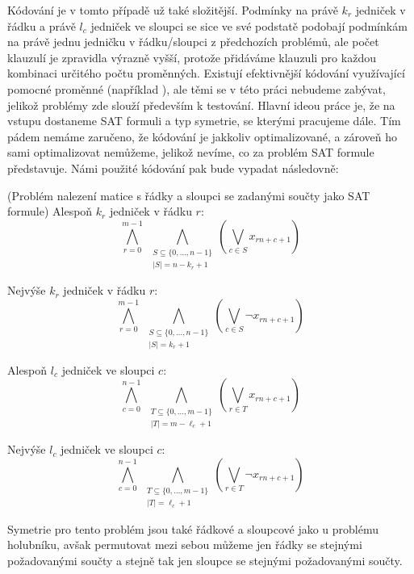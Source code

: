 Kódování je v tomto případě už také složitější. Podmínky na právě $k_r$ jedniček v řádku a právě $l_c$ jedniček ve sloupci se sice ve své podstatě podobají podmínkám na právě jednu jedničku v řádku/sloupci z předchozích problémů, ale počet klauzulí je zpravidla výrazně vyšší, protože přidáváme klauzuli pro každou kombinaci určitého počtu proměnných. Existují efektivnější kódování využívající pomocné proměnné (například \cite{zhou2020comparisonsatencodingsatmostk}), ale těmi se v této práci nebudeme zabývat, jelikož problémy zde slouží především k testování. Hlavní ideou práce je, že na vstupu dostaneme SAT formuli a typ symetrie, se kterými pracujeme dále. Tím pádem nemáme zaručeno, že kódování je jakkoliv optimalizované, a zároveň ho sami optimalizovat nemůžeme, jelikož nevíme, co za problém SAT formule představuje. Námi použité kódování pak bude vypadat následovně:

\begin{pozn}{(Problém nalezení matice s řádky a sloupci se zadanými součty jako SAT formule)}
Alespoň $k_r$ jedniček v řádku $r$: 
\[
\bigwedge_{r=0}^{m-1}
\;
\bigwedge_{\substack{
S \subseteq \{0,\dots,n-1\}\\
|S|=n-k_r+1
}}
\left(
\bigvee_{c \in S}
x_{rn+c+1}
\right)
\]

Nejvýše $k_r$ jedniček v řádku $r$:
\[
\bigwedge_{r=0}^{m-1}
\;
\bigwedge_{\substack{
S \subseteq \{0,\dots,n-1\}\\
|S|=k_r+1
}}
\left(
\bigvee_{c \in S}
\neg x_{rn+c+1}
\right)
\]

Alespoň $l_c$ jedniček ve sloupci $c$:
\[
\bigwedge_{c=0}^{n-1}
\;
\bigwedge_{\substack{
T \subseteq \{0,\dots,m-1\}\\
|T|=m-\ell_c+1
}}
\left(
\bigvee_{r \in T}
x_{rn+c+1}
\right)
\]

Nejvýše $l_c$ jedniček ve sloupci $c$:
\[
\bigwedge_{c=0}^{n-1}
\;
\bigwedge_{\substack{
T \subseteq \{0,\dots,m-1\}\\
|T|=\ell_c+1
}}
\left(
\bigvee_{r \in T}
\neg x_{rn+c+1}
\right)
\]
\end{pozn}

Symetrie pro tento problém jsou také řádkové a sloupcové jako u problému holubníku, avšak permutovat mezi sebou můžeme jen řádky se stejnými požadovanými součty a stejně tak jen sloupce se stejnými požadovanými součty.

